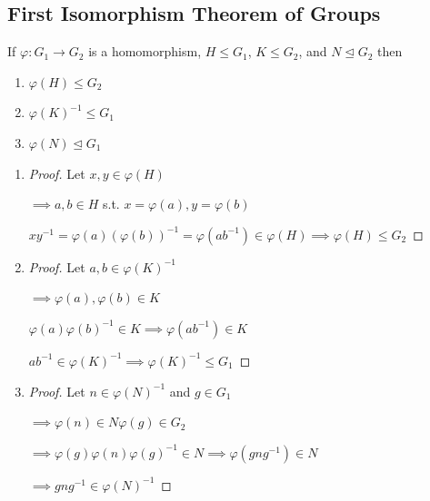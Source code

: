 \subsection{First Isomorphism Theorem of Groups}

\begin{proposition}
    If $\varphi: G_1 \rightarrow G_2$ is a homomorphism,
    $H \leq G_1$, $K \leq G_2$, and $N \unlhd G_2$ then
    \begin{enumerate}
        \item $\varphi(H) \leq G_2$
        \item $\varphi(K)^{-1}\leq G_1$
        \item $\varphi(N) \unlhd G_1$
    \end{enumerate}
\end{proposition}

\begin{enumerate}
    \item \begin{proof}
        Let $x,y\in \varphi(H)$

        $\implies a,b \in H$ s.t. $x=\varphi(a), y=\varphi(b)$

        $xy^{-1}=\varphi(a)(\varphi(b))^{-1}=\varphi(ab^{-1}) \in \varphi(H)
        \implies \varphi(H)\leq G_2$
    \end{proof}
    \item \begin{proof}
        Let $a,b\in \varphi(K)^{-1}$

        $\implies \varphi(a),\varphi(b)\in K$

        $\varphi(a)\varphi(b)^{-1}\in K \implies \varphi(ab^{-1})\in K$

        $ab^{-1} \in \varphi(K)^{-1} \implies \varphi(K)^{-1} \leq G_1$
    \end{proof}

    \item \begin{proof}
        Let $n \in \varphi(N)^{-1}$ and $g \in G_1$

        $\implies \varphi(n)\in N \varphi(g)\in G_2$

        $\implies \varphi(g)\varphi(n)\varphi(g)^{-1}\in N \implies \varphi(gng^{-1})\in N$

        $\implies gng^{-1}\in \varphi(N)^{-1}$
    \end{proof}
\end{enumerate}

